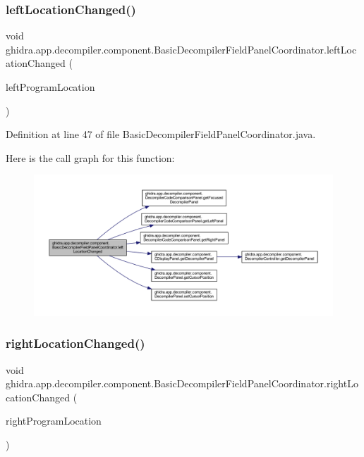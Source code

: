 \subsubsection{\texorpdfstring{leftLocationChanged()}{leftLocationChanged()}}
{\footnotesize\ttfamily void ghidra.\+app.\+decompiler.\+component.\+Basic\+Decompiler\+Field\+Panel\+Coordinator.\+left\+Location\+Changed (\begin{DoxyParamCaption}\item[{Program\+Location}]{left\+Program\+Location }\end{DoxyParamCaption})\hspace{0.3cm}{\ttfamily [inline]}}



Definition at line 47 of file Basic\+Decompiler\+Field\+Panel\+Coordinator.\+java.

Here is the call graph for this function\+:
\nopagebreak
\begin{figure}[H]
\begin{center}
\leavevmode
\includegraphics[width=350pt]{classghidra_1_1app_1_1decompiler_1_1component_1_1_basic_decompiler_field_panel_coordinator_ae1809e04fb7067bf6734d34129071183_cgraph}
\end{center}
\end{figure}
\mbox{\label{classghidra_1_1app_1_1decompiler_1_1component_1_1_basic_decompiler_field_panel_coordinator_a6db30490ab0fa6ececbfa6e079677b9c}} 
\subsubsection{\texorpdfstring{rightLocationChanged()}{rightLocationChanged()}}
{\footnotesize\ttfamily void ghidra.\+app.\+decompiler.\+component.\+Basic\+Decompiler\+Field\+Panel\+Coordinator.\+right\+Location\+Changed (\begin{DoxyParamCaption}\item[{Program\+Location}]{right\+Program\+Location }\end{DoxyParamCaption})\hspace{0.3cm}{\ttfamily [inline]}}



